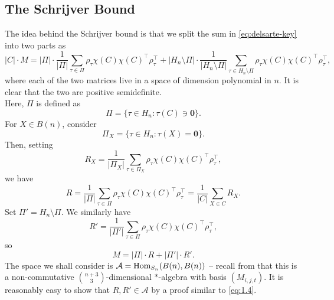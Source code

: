 \subsection{The Schrijver Bound}

	The idea behind the Schrijver bound is that we split the sum in \cref{eq:delsarte-key} into two parts as 
	\[ |C| \cdot M = |\Pi| \cdot \frac{1}{|\Pi|} \sum_{\tau \in \Pi} \rho_\tau \chi(C) \chi(C)^\top \rho_\tau^\top + |H_n \setminus \Pi| \cdot \frac{1}{|H_n \setminus \Pi|} \sum_{\tau \in H_n \setminus \Pi} \rho_\tau \chi(C) \chi(C)^\top \rho_\tau^\top, \]
	where each of the two matrices live in a space of dimension polynomial in $n$. It is clear that the two are positive semidefinite.\\
	Here, $\Pi$ is defined as
	\[ \Pi = \{ \tau \in H_n : \tau(C) \ni \mathbf{0} \}. \]
	For $X \in B(n)$, consider
	\[ \Pi_X = \{ \tau \in H_n : \tau(X) = \mathbf{0} \}. \]
	Then, setting 
	\[ R_X = \frac{1}{|\Pi_X|} \sum_{\tau \in \Pi_X} \rho_{\tau} \chi(C) \chi(C)^\top \rho_\tau^\top, \]
	we have
	\[ R = \frac{1}{|\Pi|} \sum_{\tau \in \Pi} \rho_{\tau} \chi(C) \chi(C)^\top \rho_\tau^\top = \frac{1}{|C|} \sum_{X \in C} R_X. \]
	Set $\Pi' = H_n \setminus \Pi$. We similarly have
	\[ R' = \frac{1}{|\Pi'|} \sum_{\tau \in \Pi} \rho_{\tau} \chi(C) \chi(C)^\top \rho_\tau^\top, \]
	so
	\[ M = |\Pi| \cdot R + |\Pi'| \cdot R'. \]
	The space we shall consider is $\mathcal{A} = \operatorname{Hom}_{S_n}(B(n),B(n))$ -- recall from  that this is a non-commutative $\binom{n+3}{3}$-dimensional $*$-algebra with basis $(M_{i,j,t})$. It is reasonably easy to show that $R,R' \in \mathcal{A}$ by a proof similar to \cref{eq:1.4}.

